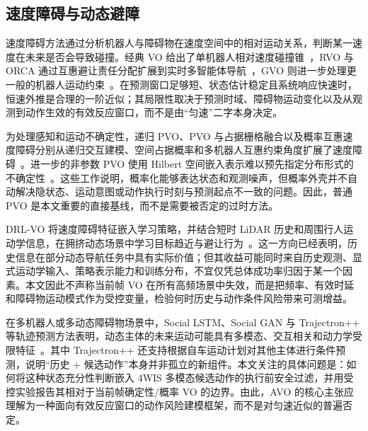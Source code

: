 \documentclass[UTF8,10pt,a4paper,twocolumn]{ctexart}
\begin{document}
\subsection{速度障碍与动态避障}

速度障碍方法通过分析机器人与障碍物在速度空间中的相对运动关系，判断某一速度在未来是否会导致碰撞。经典 VO 给出了单机器人相对速度碰撞锥~\cite{fiorini1998vo}，RVO 与 ORCA 通过互惠避让责任分配扩展到实时多智能体导航~\cite{vandenberg2008rvo,vandenberg2011orca}，GVO 则进一步处理更一般的机器人运动约束~\cite{wilkie2009gvo}。在预测窗口足够短、状态估计稳定且系统响应快速时，恒速外推是合理的一阶近似；其局限性取决于预测时域、障碍物运动变化以及从观测到动作生效的有效反应窗口，而不是由“匀速”二字本身决定。

为处理感知和运动不确定性，递归 PVO、PVO 与占据栅格融合以及概率互惠速度障碍分别从递归交互建模、空间占据概率和多机器人互惠约束角度扩展了速度障碍~\cite{kluge2006rpvo,fulgenzi2007pvo,gopalakrishnan2017prvo}。进一步的非参数 PVO 使用 Hilbert 空间嵌入表示难以预先指定分布形式的不确定性~\cite{poonganam2020pvo}。这些工作说明，概率化能够表达状态和观测噪声，但概率外壳并不自动解决隐状态、运动意图或动作执行时刻与预测起点不一致的问题。因此，普通 PVO 是本文重要的直接基线，而不是需要被否定的过时方法。

DRL-VO 将速度障碍特征嵌入学习策略，并结合短时 LiDAR 历史和周围行人运动学信息，在拥挤动态场景中学习目标趋近与避让行为~\cite{xie2023drlvo}。这一方向已经表明，历史信息在部分动态导航任务中具有实际价值；但其收益可能同时来自历史观测、显式运动学输入、策略表示能力和训练分布，不宜仅凭总体成功率归因于某一个因素。本文因此不声称当前帧 VO 在所有高频场景中失效，而是把频率、有效时延和障碍物运动模式作为受控变量，检验何时历史与动作条件风险带来可测增益。

在多机器人或多动态障碍物场景中，Social LSTM、Social GAN 与 Trajectron++ 等轨迹预测方法表明，动态主体的未来运动可能具有多模态、交互相关和动力学受限特征~\cite{alahi2016sociallstm,gupta2018socialgan,salzmann2020trajectron}。其中 Trajectron++ 还支持根据自车运动计划对其他主体进行条件预测，说明“历史 + 候选动作”本身并非孤立的新组件。本文关注的具体问题是：如何将这种状态充分性判断嵌入 4WIS 多模态候选动作的执行前安全过滤，并用受控实验报告其相对于当前帧确定性/概率 VO 的边界。由此，AVO 的核心主张应理解为一种面向有效反应窗口的动作风险建模框架，而不是对匀速近似的普遍否定。
\end{document}
